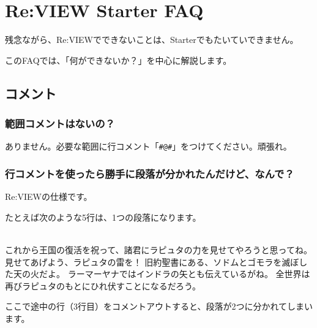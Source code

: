\chapter{Re:VIEW Starter FAQ}
\label{chap:chap02-faq}
\begin{starterabstract}
残念ながら、Re:VIEWでできないことは、Starterでもたいていできません。

このFAQでは、「何ができないか？」を中心に解説します。
\end{starterabstract}

\section{コメント}
\label{sec:2-1}

\subsection{範囲コメントはないの？}
\label{sec:2-1-1}

ありません。必要な範囲に行コメント「\texttt{\#@\#}」をつけてください。頑張れ。

\subsection{行コメントを使ったら勝手に段落が分かれたんだけど、なんで？}
\label{sec:2-1-2}

Re:VIEWの仕様です。

たとえば次のような5行は、1つの段落になります。

\begin{starterprogram}\end{starterprogram}
\noindent
{}\\

これから王国の復活を祝って、諸君にラピュタの力を見せてやろうと思ってね。
見せてあげよう、ラピュタの雷を！
旧約聖書にある、ソドムとゴモラを滅ぼした天の火だよ。
ラーマーヤナではインドラの矢とも伝えているがね。
全世界は再びラピュタのもとにひれ伏すことになるだろう。

\vspace*{\baselineskip}

ここで途中の行（3行目）をコメントアウトすると、段落が2つに分かれてしまいます。

